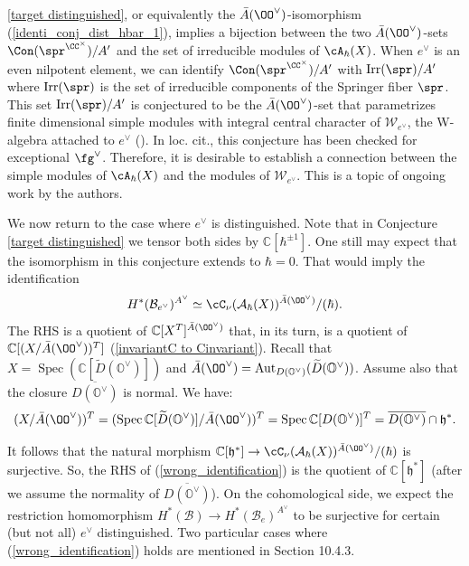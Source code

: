 \documentclass[12pt]{amsart}
\begin{document}
\begin{rmk}\label{compare simples}
    \cref{target distinguished}, or equivalently the $\bar{A}(\OO^\vee)$-isomorphism (\ref{identi_conj_dist_hbar_1}), implies a bijection between the two $\bar{A}(\OO^\vee)$-sets $\Con(\spr^{\CC^{\times}})/A'$ and the set of irreducible modules of $\cA_\hbar(X)$. When $e^\vee$ is an even nilpotent element, we can identify $\Con(\spr^{\CC^{\times}})/A'$ with $\text{Irr}(\spr)/A'$ where $\text{Irr}(\spr)$ is the set of irreducible components of the Springer fiber $\spr$. This set $\text{Irr}(\spr)/A'$ is conjectured to be the $\bar{A}(\OO^\vee)$-set that parametrizes finite dimensional simple modules with integral central character of $\mathcal{W}_{e^\vee}$, the W-algebra attached to $e^\vee$ (\cite[Conjecture 1.2]{hoang2024actioncomponentgroupsirreducible}). In loc. cit., this conjecture has been checked for exceptional $\fg^\vee$. Therefore, it is desirable to establish a connection between the simple modules of $\cA_\hbar(X)$ and the modules of $\mathcal{W}_{e^\vee}$. This is a topic of ongoing work by the authors. 
\end{rmk}

    
We now return to the case where $e^\vee$ is distinguished. Note that in Conjecture \ref{target distinguished} we tensor both sides by $\mathbb{C}[\hbar^{\pm 1}]$. One still may expect that the isomorphism in this conjecture extends to $\hbar=0$. That would imply the identification 
\begin{equation}\label{wrong_identification}
H^*(\mathcal{B}_{e^\vee})^{A^\vee} \simeq \cC_\nu(\mathcal{A}_\hbar(X))^{\Bar{A}(\OO^\vee)}/(\hbar).
\end{equation}
The RHS is a quotient of $\mathbb{C}[X^{T}]^{\Bar{A}(\OO^\vee)}$ that, in its turn, is a quotient of $\mathbb{C}[(X/\Bar{A}(\OO^\vee))^T]$ (\cref{invariantC to Cinvariant}). Recall that $X=\operatorname{Spec}(\mathbb{C}[\widetilde{D}(\mathbb{O}^\vee)])$ and $\Bar{A}(\OO^\vee)=\operatorname{Aut}_{D(\mathbb{O}^\vee)}(\widetilde{D}(\mathbb{O}^\vee))$. Assume also that the closure $\overline{D(\mathbb{O}^\vee)}$ is normal.
We have:  
\begin{equation*}
(X/\Bar{A}(\OO^\vee))^T = (\operatorname{Spec}\mathbb{C}[\widetilde{D}(\mathbb{O}^\vee)]/{\Bar{A}(\OO^\vee)})^T = \operatorname{Spec}\mathbb{C}[D(\mathbb{O}^\vee)]^T = \overline{D(\mathbb{O}^\vee)} \cap \mathfrak{h}^*.
\end{equation*}

It follows that the natural morphism $\mathbb{C}[\mathfrak{h}^*] \rightarrow \cC_\nu(\mathcal{A}_\hbar(X))^{\Bar{A}(\OO^\vee)}/(\hbar)$ is surjective. So, the RHS of (\ref{wrong_identification}) is the quotient of $\mathbb{C}[\mathfrak{h}^*]$ (after we assume the normality of $\overline{D(\mathbb{O}^\vee)}$). On the cohomological side, we expect the restriction homomorphism $H^*(\mathcal{B}) \to H^*(\mathcal{B}_e)^{A^\vee}$ to be surjective for certain (but not all) $e^\vee$ distinguished. Two particular cases where (\ref{wrong_identification}) holds are mentioned in Section 10.4.3.
\end{document}
